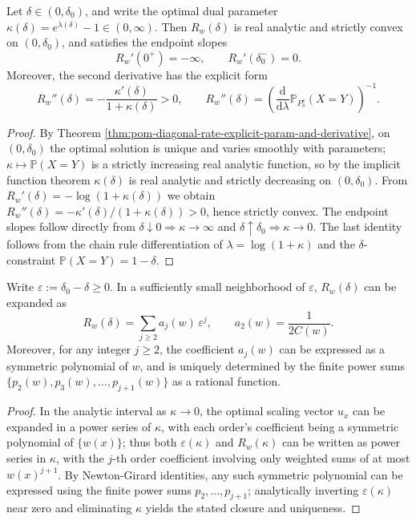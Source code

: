 \begin{proposition}\label{prop:pom-diagonal-rate-analytic-strict-convexity-curvature}
Let \(\delta\in(0,\delta_0)\), and write the optimal dual parameter \(\kappa(\delta)=e^{\lambda(\delta)}-1\in(0,\infty)\).
Then \(R_w(\delta)\) is real analytic and strictly convex on \((0,\delta_0)\), and satisfies the endpoint slopes
\[
R_w'(0^+)=-\infty,\qquad R_w'(\delta_0^-)=0.
\]
Moreover, the second derivative has the explicit form
\[
R_w''(\delta)=-\frac{\kappa'(\delta)}{1+\kappa(\delta)}>0,
\qquad
R_w''(\delta)=\left(\frac{\mathrm d}{\mathrm d\lambda}\mathbb P_{P^\star_\delta}(X=Y)\right)^{-1}.
\]
\end{proposition}
\begin{proof}
By Theorem \ref{thm:pom-diagonal-rate-explicit-param-and-derivative}, on \((0,\delta_0)\) the optimal solution is unique and varies smoothly with parameters; \(\kappa\mapsto \mathbb P(X=Y)\) is a strictly increasing real analytic function, so by the implicit function theorem \(\kappa(\delta)\) is real analytic and strictly decreasing on \((0,\delta_0)\).
From
\(
R_w'(\delta)=-\log(1+\kappa(\delta))
\)
we obtain
\(
R_w''(\delta)=-\kappa'(\delta)/(1+\kappa(\delta))>0
\),
hence strictly convex.
The endpoint slopes follow directly from \(\delta\downarrow 0\Rightarrow \kappa\to\infty\) and \(\delta\uparrow\delta_0\Rightarrow \kappa\to 0\).
The last identity follows from the chain rule differentiation of \(\lambda=\log(1+\kappa)\) and the \(\delta\)-constraint \(\mathbb P(X=Y)=1-\delta\).
\end{proof}

\begin{proposition}\label{prop:pom-diagonal-rate-finite-moment-closure}
Write \(\varepsilon:=\delta_0-\delta\ge 0\).
In a sufficiently small neighborhood of \(\varepsilon\), \(R_w(\delta)\) can be expanded as
\[
R_w(\delta)=\sum_{j\ge 2} a_j(w)\,\varepsilon^j,
\qquad
a_2(w)=\frac{1}{2C(w)}.
\]
Moreover, for any integer \(j\ge 2\), the coefficient \(a_j(w)\) can be expressed as a symmetric polynomial of \(w\), and is uniquely determined by the finite power sums \(\{p_2(w),p_3(w),\dots,p_{j+1}(w)\}\) as a rational function.
\end{proposition}
\begin{proof}
In the analytic interval as \(\kappa\to 0\), the optimal scaling vector \(u_x\) can be expanded in a power series of \(\kappa\), with each order's coefficient being a symmetric polynomial of \(\{w(x)\}\);
thus both \(\varepsilon(\kappa)\) and \(R_w(\kappa)\) can be written as power series in \(\kappa\), with the \(j\)-th order coefficient involving only weighted sums of at most \(w(x)^{j+1}\).
By Newton-Girard identities, any such symmetric polynomial can be expressed using the finite power sums \(p_2,\dots,p_{j+1}\);
analytically inverting \(\varepsilon(\kappa)\) near zero and eliminating \(\kappa\) yields the stated closure and uniqueness.
\end{proof}

